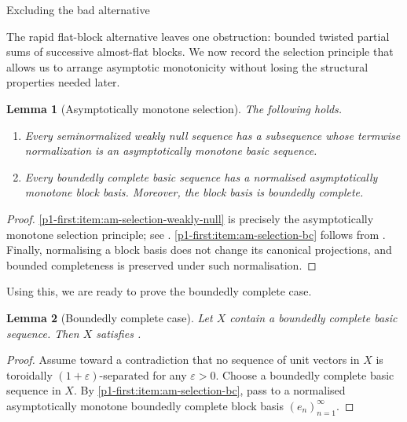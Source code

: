 \documentclass[11pt,reqno]{amsart}
\makeatletter
\theoremstyle{plain}
\newtheorem{lemma}[lemma]{Lemma}
\theoremstyle{definition}
\newcommand{\eps}{\varepsilon}
\newcounter{problempaper}
\newenvironment{problempaperbody}{%
  \setcounter{subsection}{0}%
  \setcounter{subsubsection}{0}%
  \setcounter{paragraph}{0}%
  \renewcommand{\thesubsection}{\arabic{subsection}}%
  \renewcommand{\thesubsubsection}{\thesubsection.\arabic{subsubsection}}%
  \renewcommand{\theparagraph}{\thesubsubsection.\arabic{paragraph}}%
  \let\problem@outersection\section
  \let\problem@outersubsection\subsection
  \let\problem@outersubsubsection\subsubsection
  \let\problem@outerparagraph\paragraph
  \let\section\problem@papersection
  \let\subsection\problem@papersubsection
  \let\subsubsection\problem@papersubsubsection
}{%
  \let\section\problem@outersection
  \let\subsection\problem@outersubsection
  \let\subsubsection\problem@outersubsubsection
  \let\paragraph\problem@outerparagraph
}
\newcommand{\problem@target}[2]{%
  \hypertarget{problem-\theproblempaper-#1-#2}{}%
}
\newcommand{\problem@paperheading}[3]{%
  \par\bigskip
  \problem@target{#1}{#2}%
  \noindent{\large\bfseries #2.\quad #3\par}%
  \nobreak\smallskip
}
\newcommand{\problem@papersubheading}[3]{%
  \par\medskip
  \problem@target{#1}{#2}%
  \noindent{\normalsize\bfseries #2.\quad #3\par}%
  \nobreak\smallskip
}
\newcommand{\problem@papersubsubheading}[3]{%
  \par\smallskip
  \problem@target{#1}{#2}%
  \noindent{\normalsize\itshape #2.\quad #3.\ }%
}
\def\problem@papersection{%
  \@ifstar{\problem@papersectionstar}{\problem@papersectionnostar}%
}
\def\problem@papersectionstar#1{%
  \par\bigskip\noindent{\large\bfseries #1\par}\nobreak\smallskip
}
\def\problem@papersectionnostar#1{%
  \refstepcounter{subsection}%
  \setcounter{subsubsection}{0}%
  \setcounter{paragraph}{0}%
  \problem@paperheading{section}{\thesubsection}{#1}%
  \problem@writecontentsline{section}{\thesubsection}{#1}%
}
\def\problem@papersubsection{%
  \@ifstar{\problem@papersubsectionstar}{\problem@papersubsectionnostar}%
}
\def\problem@papersubsectionstar#1{%
  \par\medskip\noindent{\normalsize\bfseries #1\par}\nobreak\smallskip
}
\def\problem@papersubsectionnostar#1{%
  \refstepcounter{subsubsection}%
  \setcounter{paragraph}{0}%
  \problem@papersubheading{subsection}{\thesubsubsection}{#1}%
  \problem@writecontentsline{subsection}{\thesubsubsection}{#1}%
}
\def\problem@papersubsubsection{%
  \@ifstar{\problem@papersubsubsectionstar}{\problem@papersubsubsectionnostar}%
}
\def\problem@papersubsubsectionstar#1{%
  \par\smallskip\noindent{\normalsize\itshape #1.\ }%
}
\def\problem@papersubsubsectionnostar#1{%
  \refstepcounter{paragraph}%
  \problem@papersubsubheading{subsubsection}{\theparagraph}{#1}%
  \problem@writecontentsline{subsubsection}{\theparagraph}{#1}%
}
\newcommand{\problem@writecontentsline}[3]{%
  \begingroup
  \protected@write\@auxout{}{%
    \string\problemcontentsentry{\theproblempaper}{#1}{#2}{#3}{\thepage}%
  }%
  \endgroup
}
\newcommand{\problemcontentsentry}[5]{%
  \@ifundefined{problemcontents@#1}{%
    \expandafter\gdef\csname problemcontents@#1\endcsname{}%
  }{}%
  \expandafter\g@addto@macro\csname problemcontents@#1\endcsname{%
    \problemcontentsline{#1}{#2}{#3}{#4}{#5}%
  }%
}
\newcommand{\problemcontentslink}[4]{%
  \hyperlink{problem-#1-#2-#3}{#4}%
}
\newcommand{\problemcontentsline}[5]{%
  \ifstrequal{#2}{section}{%
    \par\noindent
    \problemcontentslink{#1}{#2}{#3}{\makebox[2.5em][l]{#3}#4}%
    \nobreak\dotfill
    \problemcontentslink{#1}{#2}{#3}{#5}\par
  }{%
    \ifstrequal{#2}{subsection}{%
      \par\noindent\hspace*{1.5em}%
      \problemcontentslink{#1}{#2}{#3}{\makebox[3.5em][l]{#3}#4}%
      \nobreak\dotfill
      \problemcontentslink{#1}{#2}{#3}{#5}\par
    }{%
      \par\noindent\hspace*{3em}%
      \problemcontentslink{#1}{#2}{#3}{\makebox[4.5em][l]{#3}#4}%
      \nobreak\dotfill
      \problemcontentslink{#1}{#2}{#3}{#5}\par
    }%
  }%
}
\makeatother
\begin{document}
\begin{problempaperbody}
\section{Excluding the bad alternative}\label{p1-first:sec:excluding-bad-alternative}

The rapid flat-block alternative leaves one obstruction: bounded twisted partial sums of successive almost-flat blocks. We now record the selection principle that allows us to arrange asymptotic monotonicity without losing the structural properties needed later.

\begin{lemma}[Asymptotically monotone selection]
\label{p1-first:lem:am-selection}
The following holds.
\begin{enumerate}[label=\textup{(\roman*)}]
\item\label{p1-first:item:am-selection-weakly-null} Every seminormalized weakly null sequence has a subsequence whose termwise normalization is an asymptotically monotone basic sequence.

\item\label{p1-first:item:am-selection-bc} Every boundedly complete basic sequence has a normalised asymptotically monotone block basis. Moreover, the block basis is boundedly complete.
\end{enumerate}
\end{lemma}
\begin{proof}
\ref{p1-first:item:am-selection-weakly-null} is precisely the asymptotically monotone selection principle; see \cite[Lemma 3.1]{Barroso2019}. \ref{p1-first:item:am-selection-bc} follows from \cite[Lemma 2.4]{HajekKaniaRusso2018}. Finally, normalising a block basis does not change its canonical projections, and bounded completeness is preserved under such normalisation.
\end{proof}


Using this, we are ready to prove the boundedly complete case.

\begin{lemma}[Boundedly complete case]
\label{p1-first:lem:boundedly-complete}
Let $X$ contain a boundedly complete basic sequence. Then $X$ satisfies .
\end{lemma}

\begin{proof}
Assume toward a contradiction that no sequence of unit vectors in $X$ is toroidally $(1+\eps)$-separated for any $\eps>0$. Choose a boundedly complete basic sequence in $X$. By \ref{p1-first:item:am-selection-bc}, pass to a normalised asymptotically monotone boundedly complete block basis $(e_n)_{n=1}^{\infty}$.


\end{proof}
\end{problempaperbody}
\end{document}
